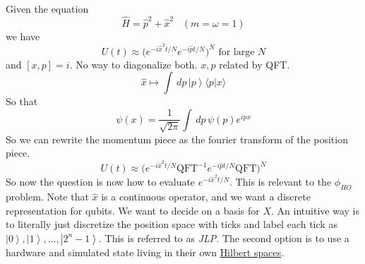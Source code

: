 \documentclass{article}
\newcommand{\ket}[1]{\ensuremath{\left|#1\right\rangle}}
\newcommand{\braket}[2]{\langle #1 | #2 \rangle}
\newcounter{question}[section]
\newcounter{example}[section]
\begin{document}
  \begin{example}
    \label{ex:harmonic-oscillator}
    Given the equation 
    \begin{equation}
      \hat{H} = \hat{p}^2 + \hat{x}^2 \;\;\; (m = \omega = 1)
    \end{equation}
    we have 
    \begin{equation}
      U(t) \approx \bigg( e^{-i \hat{x}^2 t/N} e^{-i \hat{p} t/N} \bigg)^N \text{ for large } N
    \end{equation}
    and $[x, p] = i$. No way to diagonalize both. $x, p$ related by QFT. 
    \begin{equation}
      \hat{x} \mapsto \int \,dp \, \ket{p}\braket{p}{x}
    \end{equation}
    So that 
    \begin{equation}
      \psi (x) = \frac{1}{\sqrt{2\pi}} \int \,dp \, \psi(p) e^{i p x} 
    \end{equation}
    So we can rewrite the momentum piece as the fourier transform of the position piece. 
    \begin{equation}
      U(t) \approx \bigg( e^{-i \hat{x}^2 t/N} \mathrm{QFT}^{-1} e^{-i \hat{p} t/N} \mathrm{QFT} \bigg)^N 
    \end{equation}
  So now the question is now how to evaluate $e^{-i \hat{x}^2 t/N}$. This is relevant to the $\phi_{HO}$ problem. Note that $\hat{x}$ is a continuous operator, and we want a discrete representation for qubits. We want to decide on a basis for $X$. An intuitive way is to literally just discretize the position space with ticks and label each tick as $\ket{0}, \ket{1}, \ldots, \ket{2^n - 1}$. This is referred to as \textit{JLP}. The second option is to use a hardware and simulated state living in their own \hyperref[fa-def:hilbert-space]{Hilbert spaces}. 
  \end{example}
\end{document}
